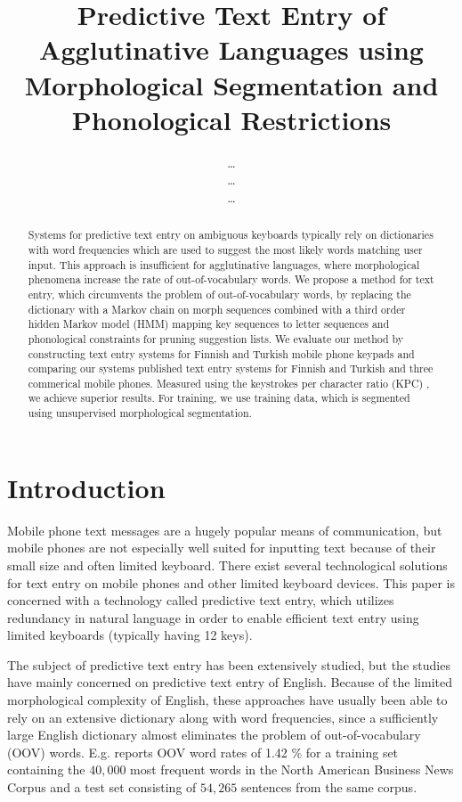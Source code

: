 \documentclass{llncs}
\begin{document}
\title{Predictive Text Entry of Agglutinative Languages using Morphological Segmentation and Phonological Restrictions}

\author{\ldots\\\ldots\\\ldots}
\institute{\ldots}

\maketitle

\begin{abstract}
Systems for predictive text entry on ambiguous keyboards typically
rely on dictionaries with word frequencies which are used to suggest
the most likely words matching user input. This approach is
insufficient for agglutinative languages, where morphological
phenomena increase the rate of out-of-vocabulary words. We propose a
method for text entry, which circumvents the problem of
out-of-vocabulary words, by replacing the dictionary with a Markov
chain on morph sequences combined with a third order hidden Markov
model (HMM) mapping key sequences to letter sequences and phonological
constraints for pruning suggestion lists. We evaluate our method by
constructing text entry systems for Finnish and Turkish mobile phone
keypads and comparing our systems published text entry systems for
Finnish and Turkish and three commerical mobile phones. Measured using
the keystrokes per character ratio (KPC) \cite{MacKenzie02kspc}, we
achieve superior results. For training, we use training data, which is
segmented using unsupervised morphological segmentation.
\end{abstract}

\section{Introduction}

Mobile phone text messages are a hugely popular means of
communication, but mobile phones are not especially well suited for
inputting text because of their small size and often limited
keyboard. There exist several technological solutions for text entry
on mobile phones and other limited keyboard devices. This paper is
concerned with a technology called predictive text entry, which
utilizes redundancy in natural language in order to enable efficient
text entry using limited keyboards (typically having 12 keys).

The subject of predictive text entry has been extensively studied, but
the studies have mainly concerned on predictive text entry of
English. Because of the limited morphological complexity of English,
these approaches have usually been able to rely on an extensive
dictionary along with word frequencies, since a sufficiently large
English dictionary almost eliminates the problem of out-of-vocabulary
(OOV) words. E.g. \cite{klarlund/2002} reports OOV word rates of 1.42
\% for a training set containing the $40,000$ most frequent words in
the North American Business News Corpus and a test set
consisting of $54,265$ sentences from the same corpus.
\end{document}
